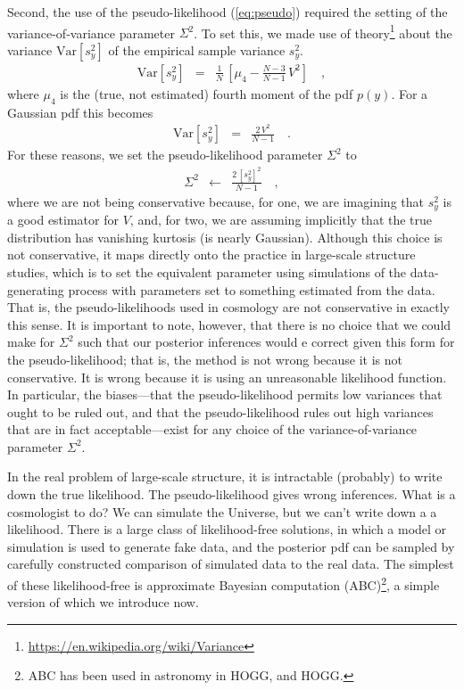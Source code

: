 \documentclass[12pt, letterpaper, preprint]{aastex}
\newcommand{\Var}{\mathrm{Var}}
\begin{document}
Second, the use of the pseudo-likelihood (\ref{eq:pseudo}) required
the setting of the variance-of-variance parameter $\Sigma^2$.
To set this, we made use of theory\footnote{\url{https://en.wikipedia.org/wiki/Variance}}
about the variance $\Var[s^2_y]$ of
the empirical sample variance $s^2_y$.
\begin{eqnarray}
\Var[s^2_y] &=& \frac{1}{N}\,\left[\mu_4 - \frac{N-3}{N-1}\,V^2\right]
\quad ,
\end{eqnarray}
where $\mu_4$ is the (true, not estimated) fourth moment of the pdf $p(y)$.
For a Gaussian pdf this becomes
\begin{eqnarray}
\Var[s^2_y] &=& \frac{2\,V^2}{N-1}
\quad .
\end{eqnarray}
For these reasons, we set the pseudo-likelihood parameter $\Sigma^2$ to
\begin{eqnarray}
\Sigma^2 &\leftarrow& \frac{2\,[s^2_y]^2}{N-1}
\quad ,
\end{eqnarray}
where we are not being conservative because, for one, we are imagining
that $s^2_y$ is a good estimator for $V$, and, for two, we are
assuming implicitly that the true distribution has vanishing kurtosis
(is nearly Gaussian).
Although this choice is not conservative, it maps directly onto the
practice in large-scale structure studies, which is to set the
equivalent parameter using simulations of the data-generating process
with parameters set to something estimated from the data.
That is, the pseudo-likelihoods used in cosmology are not conservative
in exactly this sense.
It is important to note, however, that there is no choice that we
could make for $\Sigma^2$ such that our posterior inferences would e
correct given this form for the pseudo-likelihood; that is, the method
is not wrong because it is not conservative. It is wrong because it
is using an unreasonable likelihood function.
In particular, the biases---that the pseudo-likelihood permits low
variances that ought to be ruled out, and that the pseudo-likelihood
rules out high variances that are in fact acceptable---exist for any
choice of the variance-of-variance parameter $\Sigma^2$.

In the real problem of large-scale structure, it is intractable (probably) to 
write down the true likelihood.
The pseudo-likelihood gives wrong inferences.
What is a cosmologist to do?
We can simulate the Universe, but we can't write down a a likelihood.
There is a large class of likelihood-free solutions, in which a model
or simulation is used to generate fake data, and the posterior pdf can
be sampled by carefully constructed comparison of simulated data to
the real data.
The simplest of these likelihood-free is approximate Bayesian
computation (ABC)\footnote{ABC has been used in astronomy in HOGG, and
  HOGG.}, a simple version of which we introduce now.
\end{document}
